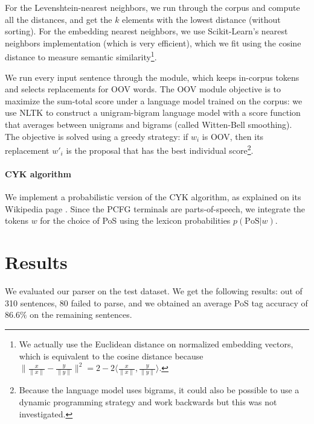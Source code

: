 \documentclass[11pt]{article}
\begin{document}
For the Levenshtein-nearest neighbors, we run through the corpus and compute all the distances, and get the $k$ elements with the lowest distance (without sorting).
For the embedding nearest neighbors, we use Scikit-Learn's nearest neighbors implementation \cite{scikit-learn} (which is very efficient), which we fit using the cosine distance to measure semantic similarity\footnote{We actually use the Euclidean distance on normalized embedding vectors, which is equivalent to the cosine distance because $\|\frac{x}{\|x\|} - \frac{y}{\|y\|}\|^2 = 2 - 2\langle \frac{x}{\|x\|}, \frac{y}{\|y\|}\rangle$.}.

We run every input sentence through the module, which keeps in-corpus tokens and selects replacements for OOV words. The OOV module objective is to maximize the sum-total score under a language model trained on the corpus: we use NLTK to construct a unigram-bigram language model with a score function that averages between unigrams and bigrams (called Witten-Bell smoothing). The objective is solved using a greedy strategy: if $w_i$ is OOV, then its replacement $w'_i$ is the proposal that has the best individual score\footnote{Because the language model uses bigrams, it could also be possible to use a dynamic programming strategy and work backwards but this was not investigated.}.

\paragraph{CYK algorithm}

We implement a probabilistic version of the CYK algorithm, as explained on its Wikipedia page \cite{wiki:CYK}. Since the PCFG terminals are parts-of-speech, we integrate the tokens $w$ for the choice of PoS using the lexicon probabilities $p(\mathrm{PoS}|w)$.


\section{Results}


We evaluated our parser on the test dataset. We get the following results: out of 310 sentences, 80 failed to parse, and we obtained an average PoS tag accuracy of $86.6\%$ on the remaining sentences.
\end{document}

